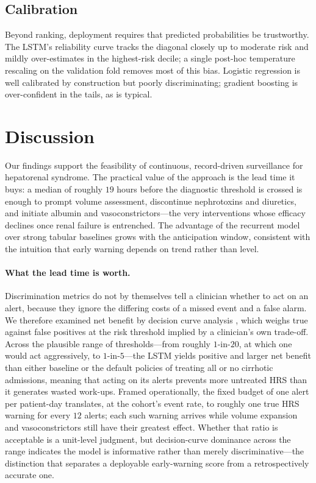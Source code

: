 \documentclass{article}
\begin{document}
\subsection{Calibration}

Beyond ranking, deployment requires that predicted probabilities be trustworthy.
The LSTM's reliability curve tracks the diagonal closely up to moderate risk and
mildly over-estimates in the highest-risk decile; a single post-hoc temperature
rescaling on the validation fold removes most of this bias. Logistic regression is
well calibrated by construction but poorly discriminating; gradient boosting is
over-confident in the tails, as is typical.

\section{Discussion}

Our findings support the feasibility of continuous, record-driven surveillance for
hepatorenal syndrome. The practical value of the approach is the lead time it
buys: a median of roughly $19$ hours before the diagnostic threshold is crossed is
enough to prompt volume assessment, discontinue nephrotoxins and diuretics, and
initiate albumin and vasoconstrictors---the very interventions whose efficacy
declines once renal failure is entrenched. The advantage of the recurrent model
over strong tabular baselines grows with the anticipation window, consistent with
the intuition that early warning depends on trend rather than level.

\paragraph{What the lead time is worth.} Discrimination metrics do not by themselves
tell a clinician whether to act on an alert, because they ignore the differing costs
of a missed event and a false alarm. We therefore examined net benefit by decision
curve analysis \citep{Vickers2006}, which weighs true against false positives at the
risk threshold implied by a clinician's own trade-off. Across the plausible range of
thresholds---from roughly $1$-in-$20$, at which one would act aggressively, to
$1$-in-$5$---the LSTM yields positive and larger net benefit than either baseline or
the default policies of treating all or no cirrhotic admissions, meaning that acting
on its alerts prevents more untreated HRS than it generates wasted work-ups. Framed
operationally, the fixed budget of one alert per patient-day translates, at the
cohort's event rate, to roughly one true HRS warning for every $12$ alerts; each such
warning arrives while volume expansion and vasoconstrictors still have their greatest
effect. Whether that ratio is acceptable is a unit-level judgment, but decision-curve
dominance across the range indicates the model is informative rather than merely
discriminative---the distinction that separates a deployable early-warning score from
a retrospectively accurate one.
\end{document}
